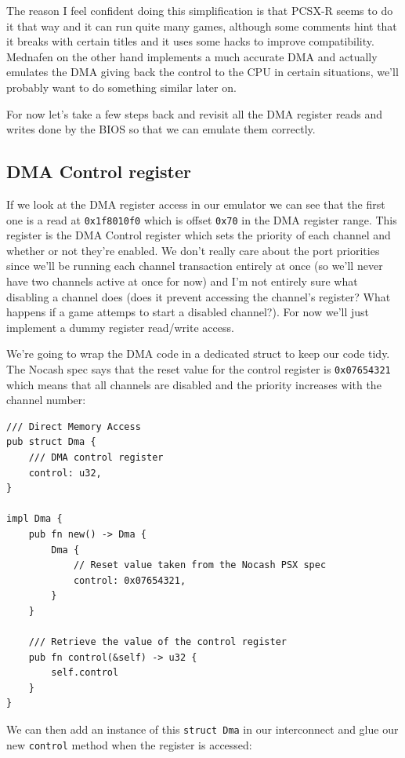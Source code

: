 \documentclass[a4paper]{article}
\newcommand{\code}[1] {\texttt{#1}}
\begin{document}
The reason I feel confident doing this simplification is that PCSX-R
seems to do it that way and it can run quite many games, although some
comments hint that it breaks with certain titles and it uses some
hacks to improve compatibility. Mednafen on the other hand implements
a much accurate DMA and actually emulates the DMA giving back the
control to the CPU in certain situations, we'll probably want to do
something similar later on.

For now let's take a few steps back and revisit all the DMA register
reads and writes done by the BIOS so that we can emulate them
correctly.

\subsection{DMA Control register}

If we look at the DMA register access in our emulator we can see that
the first one is a read at \code{0x1f8010f0} which is offset
\code{0x70} in the DMA register range. This register is the DMA
Control register which sets the priority of each channel and whether
or not they're enabled. We don't really care about the port priorities
since we'll be running each channel transaction entirely at once (so
we'll never have two channels active at once for now) and I'm not
entirely sure what disabling a channel does (does it prevent accessing
the channel's register? What happens if a game attemps to start a
disabled channel?). For now we'll just implement a dummy register
read/write access.

We're going to wrap the DMA code in a dedicated struct to keep our
code tidy. The Nocash spec says that the reset value for the control
register is \code{0x07654321} which means that all channels are
disabled and the priority increases with the channel number:

\begin{lstlisting}
/// Direct Memory Access
pub struct Dma {
    /// DMA control register
    control: u32,
}

impl Dma {
    pub fn new() -> Dma {
        Dma {
            // Reset value taken from the Nocash PSX spec
            control: 0x07654321,
        }
    }

    /// Retrieve the value of the control register
    pub fn control(&self) -> u32 {
        self.control
    }
}
\end{lstlisting}

We can then add an instance of this \code{struct Dma} in our
interconnect and glue our new \code{control} method when the register
is accessed:
\end{document}
